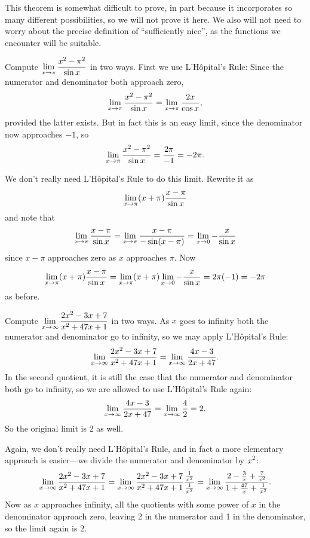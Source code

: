 This theorem is somewhat difficult to prove, in part because it
incorporates so many different possibilities, so we will not prove it
here. We also will not need to worry about the precise definition of 
``sufficiently nice'', as the functions we encounter will be
suitable. 


\begin{example}
Compute $\displaystyle\lim_{x\to \pi}{x^2-\pi^2\over \sin x}$ in two ways.
\msk
First we use L'H\^opital's Rule: Since the numerator and denominator
both approach zero,
$$\lim_{x\to \pi}{x^2-\pi^2\over \sin x}=
\lim_{x\to \pi}{2x \over \cos x},$$
provided the latter exists. But in fact this is an easy limit, since
the denominator now approaches $-1$, so 
$$\lim_{x\to \pi}{x^2-\pi^2\over \sin x}={2\pi\over -1} = -2\pi.$$

We don't really need L'H\^opital's Rule to do this limit. Rewrite it
as 
$$\lim_{x\to \pi}(x+\pi){x-\pi\over \sin x}$$
and note that 
$$\lim_{x\to \pi}{x-\pi\over \sin x}=
\lim_{x\to \pi}{x-\pi\over -\sin (x-\pi)}=
\lim_{x\to 0}-{x\over \sin x}$$
since $x-\pi$ approaches zero as $x$ approaches $\pi$.
Now
$$\lim_{x\to \pi}(x+\pi){x-\pi\over \sin x}=
\lim_{x\to \pi}(x+\pi)\lim_{x\to 0}-{x\over \sin x}=
2\pi(-1)=-2\pi$$
as before.
\end{example}

\begin{example} Compute $\displaystyle\lim_{x\to \infty}{2x^2-3x+7\over
x^2+47x+1}$ in two ways.
\msk
As $x$ goes to infinity both the numerator and denominator go to
infinity, so we may apply L'H\^opital's Rule:
$$\lim_{x\to \infty}{2x^2-3x+7\over x^2+47x+1}=
\lim_{x\to \infty}{4x-3\over 2x+47}.$$
In the second quotient, it is still the case that the numerator and
denominator both go to infinity, so we are allowed to use
L'H\^opital's Rule again:
$$\lim_{x\to \infty}{4x-3\over 2x+47}=\lim_{x\to \infty}{4\over 2}=2.$$
So the original limit is 2 as well.

Again, we don't really need L'H\^opital's Rule, and in fact a more
elementary approach is easier---we divide the numerator and
denominator by $\displaystyle x^2$:
$$\lim_{x\to \infty}{2x^2-3x+7\over x^2+47x+1}=
\lim_{x\to \infty}{2x^2-3x+7\over x^2+47x+1}{{1\over x^2}\over {1\over
    x^2}}=
\lim_{x\to \infty}{2-{3\over x}+{7\over x^2}\over
1+{47\over x}+{1\over x^2}}.$$
Now as $x$ approaches infinity, all the quotients with some power of
$x$ in the denominator approach zero, leaving 2 in the numerator and 1
in the denominator, so the limit again is 2.
\end{example}

